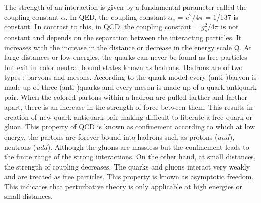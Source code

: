 The strength of an interaction is given by a fundamental parameter called the coupling constant $\alpha$. In QED, the coupling constant $\alpha_e$ = $e^2/4\pi$ = 1/137 is constant. In contrast to this, in QCD, the coupling constant \alpsq = $g^2_s/4\pi$ is not constant and depends on the separation between the interacting particles. It increases with the increase in the distance or decrease in the energy scale Q. At large distances or low energies, the quarks can never be found as free particles but exit in color neutral bound states known as hadrons. Hadrons are of two types : baryons and mesons. According to the quark model \cite{Griffiths:111880} every (anti-)baryon is made up of three (anti-)quarks and every meson is made up of a quark-antiquark pair. When the colored partons within a hadron are pulled farther and farther apart, there is an increase in the strength of force between them. This results in creation of new quark-antiquark pair making difficult to liberate a free quark or gluon. This property of QCD is known as confinement according to which at low energy, the partons are forever bound into hadrons such as protons ($uud$), neutrons ($udd$). Although the gluons are massless but the confinement leads to the finite range of the strong interactions. On the other hand, at small distances, the strength of coupling decreases. The quarks and gluons interact very weakly and are treated as free particles. This property is known as asymptotic freedom. This indicates that perturbative theory is only applicable at high energies or small distances.

